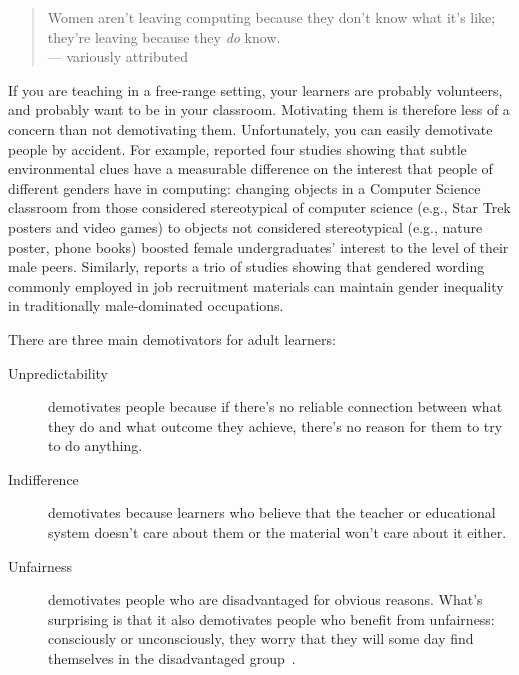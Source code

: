 
\begin{quote}

  Women aren't leaving computing because they don't know what it's like;
  they're leaving because they \emph{do} know. \\
  --- variously attributed

\end{quote}

If you are teaching in a free-range setting,
your learners are probably volunteers,
and probably want to be in your classroom.
Motivating them is therefore less of a concern than not demotivating them.
Unfortunately,
you can easily demotivate people by accident.
For example,
\cite{Cher2009} reported four studies showing that
subtle environmental clues have a measurable difference on the interest that people of different genders have in computing:
changing objects in a Computer Science classroom from those considered stereotypical of computer science
(e.g., Star Trek posters and video games)
to objects not considered stereotypical (e.g., nature poster, phone books)
boosted female undergraduates' interest to the level of their male peers.
Similarly,
\cite{Gauc2011} reports a trio of studies showing that
gendered wording commonly employed in job recruitment materials
can maintain gender inequality in traditionally male-dominated occupations.

There are three main demotivators for adult learners:

\begin{description}

\item[Unpredictability]
  demotivates people because
  if there's no reliable connection between what they do and what outcome they achieve,
  there's no reason for them to try to do anything.

\item[Indifference]
  demotivates because
  learners who believe that the teacher or educational system doesn't care about them
  or the material won't care about it either.

\item[Unfairness]
  demotivates people who are disadvantaged for obvious reasons.
  What's surprising is that it also demotivates people who benefit from unfairness:
  consciously or unconsciously,
  they worry that
  they will some day find themselves in the disadvantaged group~\cite{Wilk2011}.

\end{description}

